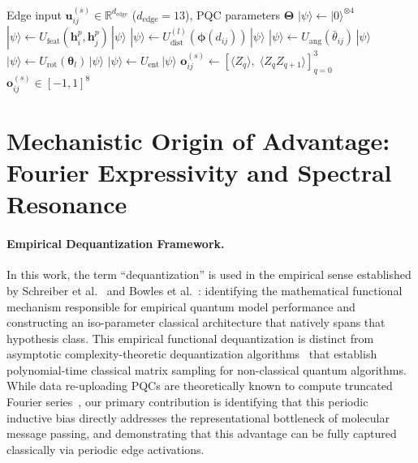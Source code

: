 \documentclass[10pt,twocolumn,letterpaper]{article}
\begin{document}
\begin{algorithm}[t]
\caption{Q-PRISM Edge Operator (substitutes Algorithm~\ref{alg:prism} line~\ref{alg:prism_edge})}
\label{alg:qprism_edge}
\begin{algorithmic}[1]
\REQUIRE Edge input $\mathbf{u}_{ij}^{(s)} \in \mathbb{R}^{d_{\mathrm{edge}}}$ ($d_{\mathrm{edge}} = 13$), PQC parameters $\boldsymbol{\Theta}$
\STATE $|\psi\rangle \leftarrow |0\rangle^{\otimes 4}$
    \STATE $|\psi\rangle \leftarrow U_{\mathrm{feat}}(\mathbf{h}_i^p, \mathbf{h}_j^p)\,|\psi\rangle$ 
    \STATE $|\psi\rangle \leftarrow U_{\mathrm{dist}}^{(l)}(\boldsymbol{\phi}(d_{ij}))\,|\psi\rangle$ 
    \STATE $|\psi\rangle \leftarrow U_{\mathrm{ang}}(\bar{\theta}_{ij})\,|\psi\rangle$ 
    \STATE $|\psi\rangle \leftarrow U_{\mathrm{rot}}(\boldsymbol{\theta}_l)\,|\psi\rangle$ 
    \STATE $|\psi\rangle \leftarrow U_{\mathrm{ent}}\,|\psi\rangle$ 
\ENDFOR
\STATE $\mathbf{o}_{ij}^{(s)} \leftarrow [\langle Z_q \rangle,\; \langle Z_q Z_{q+1} \rangle]_{q=0}^3$ 
\RETURN $\mathbf{o}_{ij}^{(s)} \in [-1, 1]^8$
\end{algorithmic}
\end{algorithm}

\section{Mechanistic Origin of Advantage: Fourier Expressivity and Spectral Resonance}
\label{sm:mechanism_details}
\label{sm:spectral}
\label{sm:omega}
\label{sec:omega_sensitivity}
\label{sm:dequant_details}

\paragraph{Empirical Dequantization Framework.}
In this work, the term ``dequantization'' is used in the empirical sense established by Schreiber et al.~\cite{Schreiber:2022roq} and Bowles et al.~\cite{bowles2024better}: identifying the mathematical functional mechanism responsible for empirical quantum model performance and constructing an iso-parameter classical architecture that natively spans that hypothesis class. This empirical functional dequantization is distinct from asymptotic complexity-theoretic dequantization algorithms~\cite{Tang:2018lmw} that establish polynomial-time classical matrix sampling for non-classical quantum algorithms.
While data re-uploading PQCs are theoretically known to compute truncated Fourier series~\cite{Schuld:2020enb, landman2023approximating}, our primary contribution is identifying that this periodic inductive bias directly addresses the representational bottleneck of molecular message passing, and demonstrating that this advantage can be fully captured classically via periodic edge activations.
\end{document}
